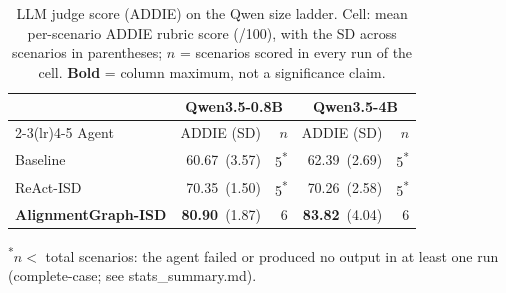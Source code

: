 
\begin{table}[t]
  \caption{LLM judge score (ADDIE) on the Qwen size ladder. Cell: mean per-scenario ADDIE rubric score (/100), with the SD across scenarios in parentheses; $n$ = scenarios scored in every run of the cell. \textbf{Bold} = column maximum, not a significance claim.}
  \label{tab:rq1-ladder}
  \small
  \begin{tabular}{@{}lr@{\hskip 3pt}rr@{\hskip 3pt}r@{}}
    \toprule
    & \multicolumn{2}{c}{Qwen3.5-0.8B} & \multicolumn{2}{c}{Qwen3.5-4B} \\
    \cmidrule(lr){2-3}\cmidrule(lr){4-5}
    Agent & ADDIE {\scriptsize(SD)} & $n$ & ADDIE {\scriptsize(SD)} & $n$ \\
    \midrule
    Baseline & 60.67~{\scriptsize(3.57)} & 5\textsuperscript{*} & 62.39~{\scriptsize(2.69)} & 5\textsuperscript{*} \\
    ReAct-ISD & 70.35~{\scriptsize(1.50)} & 5\textsuperscript{*} & 70.26~{\scriptsize(2.58)} & 5\textsuperscript{*} \\
    \textbf{AlignmentGraph-ISD} & \textbf{80.90}~{\scriptsize(1.87)} & 6 & \textbf{83.82}~{\scriptsize(4.04)} & 6 \\
    \bottomrule
  \end{tabular}
  \par\smallskip\footnotesize\textsuperscript{*}$n<$ total scenarios: the agent failed or produced no output in at least one run (complete-case; see stats\_summary.md).
\end{table}
